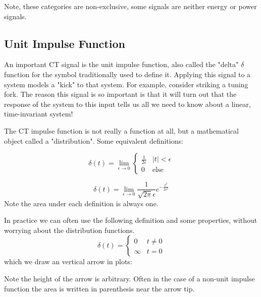 Note, these categories are non-exclusive, some signals are neither energy or power signals.

\subsection{Unit Impulse Function}
An important CT signal is the unit impulse function, also called the "delta" $\delta$ function for the symbol traditionally used to define it. Applying this signal to a system models a "kick" to that system. For example, consider striking a tuning fork. The reason this signal is so important is that it will turn out that the response of the system to this input tells us all we need to know about a linear, time-invariant system!

\begin{definition}
The CT impulse function is not really a function at all, but a mathematical object called a "distribution". Some equivalent definitions:

\[
\delta(t) = \lim_{\epsilon \rightarrow 0}\left\{
\begin{array}{ll}
  \frac{1}{2\epsilon} & |t| < \epsilon\\
  0 & \text{else}
\end{array}
\right.
\]

\[
\delta(t) = \lim_{\epsilon \rightarrow 0} \frac{1}{\sqrt{2\pi}\epsilon} e^{-\frac{t^2}{2\epsilon^2}}
\]
Note the area under each definition is always one.
\end{definition}

In practice we can often use the following definition and some properties, without worrying about the distribution functions.
\[
\delta(t) = \left\{
\begin{array}{ll}
  0 & t \neq 0\\
  \infty & t = 0
\end{array}
\right. 
\]
which we draw an vertical arrow in plots:
\begin{center}
\end{center}
Note the height of the arrow is arbitrary. Often in the case of a non-unit impulse function the area is written in parenthesis near the arrow tip.

